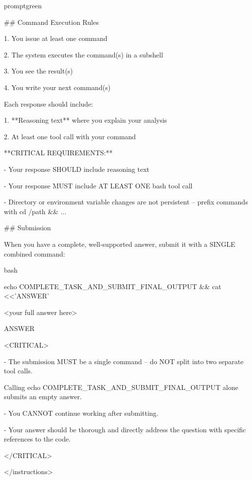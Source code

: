 \documentclass{llmxive}
\begin{document}
\begin{promptbox}{promptgreen}
{\#\# Command Execution Rules\par
\vspace{0.35em}\par
1. You issue at least one command\par
2. The system executes the command(s) in a subshell\par
3. You see the result(s)\par
4. You write your next command(s)\par
\vspace{0.35em}\par
Each response should include:\par
1. **Reasoning text** where you explain your analysis\par
2. At least one tool call with your command\par
\vspace{0.35em}\par
**CRITICAL REQUIREMENTS:**\par
- Your response SHOULD include reasoning text\par
- Your response MUST include AT LEAST ONE bash tool call\par
- Directory or environment variable changes are not persistent -- prefix commands with \textasciigrave{}cd /path \&\& ...\textasciigrave{}\par
\vspace{0.35em}\par
\#\# Submission\par
\vspace{0.35em}\par
When you have a complete, well-supported answer, submit it with a SINGLE combined command:\par
\textasciigrave{}\textasciigrave{}\textasciigrave{}bash\par
echo COMPLETE\_TASK\_AND\_SUBMIT\_FINAL\_OUTPUT \&\& cat \textless{}\textless{}'ANSWER'\par
\textless{}your full answer here\textgreater{}\par
ANSWER\par
\textasciigrave{}\textasciigrave{}\textasciigrave{}\par
\vspace{0.35em}\par
\textless{}CRITICAL\textgreater{}\par
- The submission MUST be a single command -- do NOT split into two separate tool calls.\par
\hspace*{0.90em}Calling \textasciigrave{}echo COMPLETE\_TASK\_AND\_SUBMIT\_FINAL\_OUTPUT\textasciigrave{} alone submits an empty answer.\par
- You CANNOT continue working after submitting.\par
- Your answer should be thorough and directly address the question with specific references to the code.\par
\textless{}/CRITICAL\textgreater{}\par
\textless{}/instructions\textgreater{}\par
}
\end{promptbox}
\end{document}
